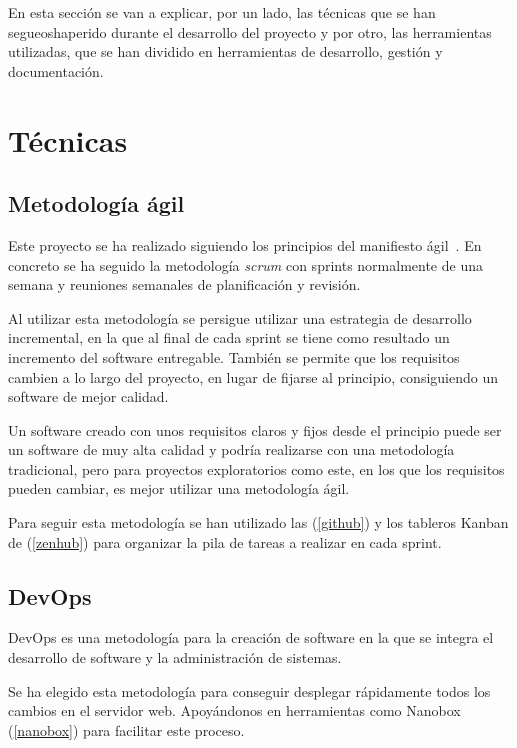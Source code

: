
En esta sección se van a explicar, por un lado, las técnicas que se han segueoshaperido durante el desarrollo del proyecto y por otro, las herramientas utilizadas, que se han dividido en herramientas de desarrollo, gestión y documentación.

\section{Técnicas}

\subsection{Metodología ágil}

Este proyecto se ha realizado siguiendo los principios del manifiesto ágil~\cite{art:agilemanifesto}. En concreto se ha seguido la metodología \textit{scrum} \cite{book:scrum} con sprints normalmente de una semana y reuniones semanales de planificación y revisión.

Al utilizar esta metodología se persigue utilizar una estrategia de desarrollo incremental, en la que al final de cada sprint se tiene como resultado un incremento del software entregable. También se permite que los requisitos cambien a lo largo del proyecto, en lugar de fijarse al principio, consiguiendo un software de mejor calidad.

Un software creado con unos requisitos claros y fijos desde el principio puede ser un software de muy alta calidad y podría realizarse con una metodología tradicional, pero para proyectos exploratorios como este, en los que los requisitos pueden cambiar, es mejor utilizar una metodología ágil.

Para seguir esta metodología se han utilizado las  (\ref{github}) y los tableros Kanban de  (\ref{zenhub}) para organizar la pila de tareas a realizar en cada sprint.

\subsection{DevOps}

DevOps \cite{misc:devops} es una metodología para la creación de software en la que se integra el desarrollo de software y la administración de sistemas.

Se ha elegido esta metodología para conseguir desplegar rápidamente todos los cambios en el servidor web. Apoyándonos en herramientas como Nanobox (\ref{nanobox}) para facilitar este proceso.

